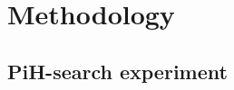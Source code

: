 \documentclass[final,5p,times,twocolumn]{elsarticle}
\begin{document}


\section{Methodology}\label{sec:experiment_methods}

\subsection{PiH-search experiment}
\end{document}
